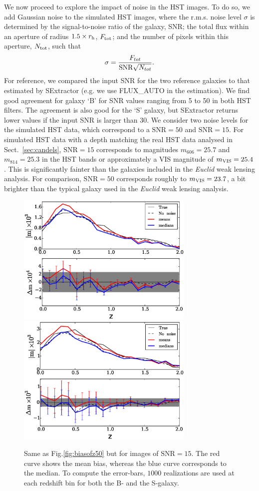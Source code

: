 \documentclass[useAMS,usenatbib]{mnras}
\newcommand{\be}{\begin{equation}}
\newcommand{\ee}{\end{equation}}
\begin{document}
We now proceed to explore the impact of noise in the HST images. To do so, we add Gaussian noise to the simulated HST images, where the r.m.s. noise level $\sigma$ is determined by the signal-to-noise ratio of the galaxy, SNR; the total flux within an aperture of radius $1.5\times r_{\rm h}$, $F_{\rm tot}$; and the number of pixels within this aperture, $N_{\rm tot}$, such that
%
\be
\sigma = {F_{tot} \over {\rm SNR} \sqrt{N_{tot}} }.
\ee
%
For reference, we compared the input SNR for the two reference
galaxies to that estimated by {\sc SExtractor} \citep{Bertin96}
(e.g. we use {\sc FLUX\_AUTO} in the estimation).  We find good
agreement for galaxy `B' for SNR values ranging from 5 to 50 in both
HST filters. The agreement is also good for the `S' galaxy, but {\sc
  SExtractor} returns lower values if the input SNR is larger than 30.
We consider two noise levels for the simulated HST data, which correspond
to a \mbox{$\mathrm{SNR}=50$} and \mbox{$\mathrm{SNR}=15$}. For simulated
HST data with a depth matching the real HST data analysed in
Sect.~\ref{sec:candels}, \mbox{$\mathrm{SNR}=15$} corresponds to
magnitudes $m_{606}=25.7$ and $m_{814}=25.3$ in the HST bands
or approximately a VIS magnitude of $m_{\rm VIS}=25.4$. This is
significantly fainter than the galaxies included in the {\it Euclid}
weak lensing analysis. For comparison, \mbox{$\mathrm{SNR}=50$}
corresponds roughly to $m_{\rm VIS} = 23.7$, a bit brighter than
the typical galaxy used in the {\it Euclid} weak lensing analysis.
%
\begin{figure}
  \includegraphics[width=8.5cm]{zs2n_b_snrtt15_medians.eps}
  \includegraphics[width=8.5cm]{zs2n_s_snrtt15_medians.eps}
\caption{Same as Fig.\ref{fig:biasofz50} but for images of
  $\mathrm{SNR}=15$. The red curve shows the mean bias, whereas the
  blue curve corresponds to the median.  To compute the error-bars,
  $1000$ realizations are used at each redshift bin for both the B- and
  the S-galaxy.}
\label{fig:biasofz15}
\end{figure}
\end{document}
